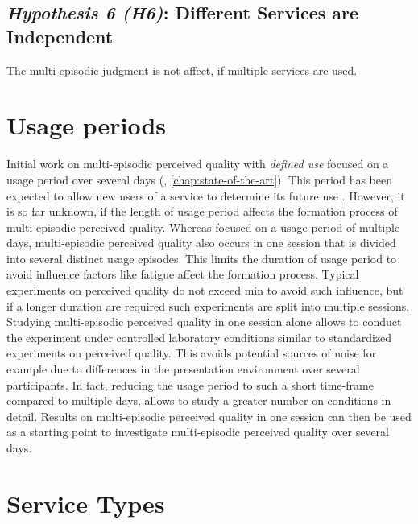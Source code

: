 \subsection*{\emph{Hypothesis 6 (H6)}: Different Services are Independent}
\begin{hypothesis}[H6]
The multi-episodic judgment is not affect, if multiple services are used.
\end{hypothesis}


\section{Usage periods}
Initial work on multi-episodic perceived quality with \emph{defined use} focused on a usage period over several days (\cf, \autoref{chap:state-of-the-art}). 
This period has been expected to allow new users of a service to determine its future use \citep[\cf,][]{moller_single-call_2011}.
However, it is so far unknown, if the length of usage period affects the formation process of multi-episodic perceived quality.
Whereas \cite{moller_single-call_2011} focused on a usage period of multiple days, multi-episodic perceived quality also occurs in one session that is divided into several distinct usage episodes.
This limits the duration of usage period to avoid influence factors like fatigue affect the formation process.
Typical experiments on perceived quality do not exceed \unit[90]{min} to avoid such influence, but if a longer duration are required such experiments are split into multiple sessions.
Studying multi-episodic perceived quality in one session alone allows to conduct the experiment under controlled laboratory conditions similar to standardized experiments on perceived quality.
This avoids potential sources of noise for example due to differences in the presentation environment over several participants.
In fact, reducing the usage period to such a short time-frame compared to multiple days, allows to study a greater number on conditions in detail.
Results on multi-episodic perceived quality in one session can then be used as a starting point to investigate multi-episodic perceived quality over several days.

\section{Service Types}

